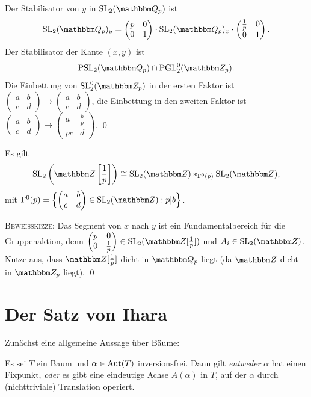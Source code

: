 \documentclass[a4paper, 12pt, twoside]{article}
\begin{document}
Der Stabilisator von $y$ in $\SL_2(\QQ_p)$ ist
\[
\SL_2(\QQ_p)_y
=
\begin{pmatrix}
p & 0 \\
0 & 1
\end{pmatrix}\cdot
\SL_2(\QQ_p)_x \cdot
\begin{pmatrix}
\frac{1}{p} & 0 \\
0 & 1
\end{pmatrix}.
\]
Der Stabilisator der Kante $(x,y)$ ist
\[
\PSL_2(\QQ_p)\cap\PGL_2^0(\ZZ_p).
\]
Die Einbettung von
$\SL_2^0(\ZZ_p)$ in der ersten Faktor ist
$\begin{pmatrix} a&b\\ c&d\end{pmatrix}\mapsto
\begin{pmatrix} a&b\\ c&d\end{pmatrix}$, die Einbettung in den
zweiten Faktor ist
$\begin{pmatrix} a&b\\ c&d\end{pmatrix}\mapsto
\begin{pmatrix} a&\frac{b}{p}\\ pc&d\end{pmatrix}$.
\qed

\BEM Es gilt
\[
\SL_2\left(\ZZ\left[\frac{1}{p}\right]\right) \cong \SL_2(\ZZ) *_{\Gamma^0(p)} \SL_2(\ZZ),
\]
mit
$\Gamma^0(p)=
\Bigl\{\begin{pmatrix} a&b\\ c&d\end{pmatrix}\in\SL_2(\ZZ) :
p|b \Bigr\}$.

\textsc{Beweisskizze}: Das Segment von $x$ nach $y$ ist ein
Fundamentalbereich für die Gruppenaktion, denn
$\begin{pmatrix} p&0\\ 0&\frac{1}{p}\end{pmatrix}\in
\SL_2(\ZZ[\frac{1}{p}])$ und $A_i\in\SL_2(\ZZ)$.
Nutze aus, dass $\ZZ[\frac{1}{p}]$ dicht in $\QQ_p$ liegt
(da $\ZZ$ dicht in $\ZZ_p$ liegt).
\qed


\section{Der Satz von Ihara}\label{sec_ihara}

Zunächst eine allgemeine Aussage über Bäume:

\PROP\label{prop_fp_achse}
Es sei $T$ ein Baum und $\alpha\in\mathrm{Aut}(T)$ inversionsfrei.
Dann gilt \textsl{entweder} $\alpha$ hat einen Fixpunkt,
\textsl{oder} es gibt eine eindeutige Achse $A(\alpha)$ in $T$,
auf der $\alpha$ durch (nichttriviale) Translation operiert.
\end{document}
